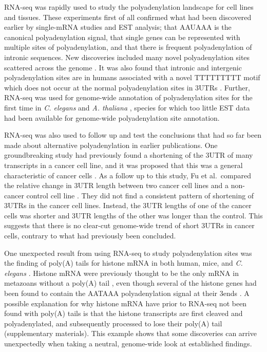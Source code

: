 RNA-seq was rapidly used to study the polyadenylation landscape for cell lines
and tissues. These experiments first of all confirmed what had been discovered
earlier by single-mRNA studies and EST analysis; that AAUAAA is the canonical
polyadenylation signal, that single genes can be represented with multiple
sites of polyadenylation, and that there is frequent polyadenylation of
intronic sequences. New discoveries included many novel polyadenylation sites
scattered across the genome \cite{ozsolak_comprehensive_2010,
derti_quantitative_2012}. It was also found that intronic and intergenic
polyadenylation sites are in humans associated with a novel TTTTTTTTT motif which does
not occur at the normal polyadenylation sites in 3\ppp UTRs
\cite{ozsolak_comprehensive_2010}. Further, RNA-seq was used for genome-wide
annotation of polyadenylation sites for the first time in \textit{C. elegans}
and \textit{A. thaliana} \cite{mangone_landscape_2010, wu_genome-wide_2011},
species for which too little EST data had been available for genome-wide
polyadenylation site annotation.

RNA-seq was also used to follow up and test the conclusions that had so far
been made about alternative polyadenylation in earlier publications. One
groundbreaking study had previously found a shortening of the 3\ppp UTR of many
transcripts in a cancer cell line, and it was proposed that this was a general
characteristic of cancer cells \cite{mayr_widespread_2009}. As a follow up to
this study, Fu et al.\ compared the relative change in 3\ppp UTR length between
two cancer cell lines and a non-cancer control cell line
\cite{fu_differential_2011}. They did not find a consistent pattern of
shortening of 3\ppp UTRs in the cancer cell lines. Instead, the 3\ppp UTR
lengths of one of the cancer cells was shorter and 3\ppp UTR lengths of the
other was longer than the control. This suggests that there is no clear-cut
genome-wide trend of short 3\ppp UTRs in cancer cells, contrary to what had
previously been concluded.

One unexpected result from using RNA-seq to study polyadenylation sites was the
finding of poly(A) tails for histone mRNA in both human, mice, and \textit{C.
elegans} \cite{mangone_landscape_2010, shepard_complex_2011}. Histone mRNA
were previously thought to be the only mRNA in metazoans without a poly(A) tail
\cite{marzluff_metabolism_2008}, even though several of the histone genes had
been found to contain the AATAAA polyadenylation signal at their 3\ppp ends
\cite{keall_histone_2007}. A possible explanation for why histone mRNA have
prior to RNA-seq not been found with poly(A) tails is that the histone
transcripts are first cleaved and polyadenylated, and subsequently processed to
lose their poly(A) tail \cite{mangone_landscape_2010} (supplementary
materials). This example shows that some discoveries can arrive unexpectedly
when taking a neutral, genome-wide look at established findings.

